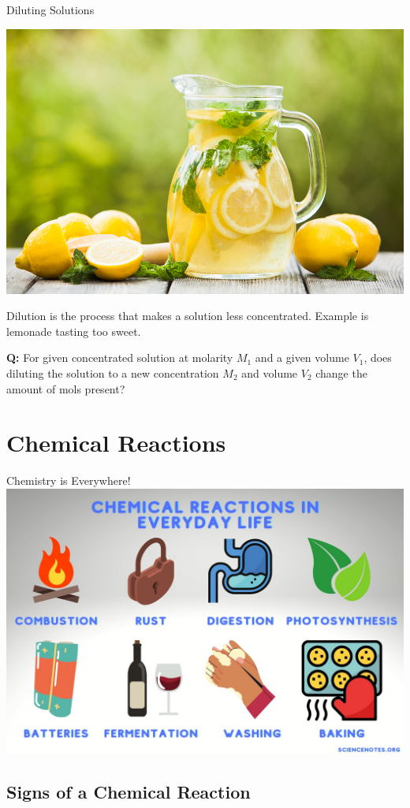 \documentclass[11pt]{beamer}
\begin{document}
\begin{frame}{Diluting Solutions}
  \begin{center}
    \includegraphics[width=0.4\linewidth]{lemonade}
  \end{center}
  
  Dilution is the process that makes a solution less concentrated. Example is
  lemonade tasting too sweet.

  \textbf{Q:} For given concentrated solution at molarity $M_1$ and a given volume $V_1$, does
  diluting the solution to a new concentration $M_2$ and volume $V_2$ change the amount of mols
  present?
\end{frame}

\section{Chemical Reactions}

\begin{frame}{Chemistry is Everywhere!}
  \centering
  \includegraphics[width=\linewidth]{chem_reactions}
\end{frame}

\subsection{Signs of a Chemical Reaction}
\end{document}
